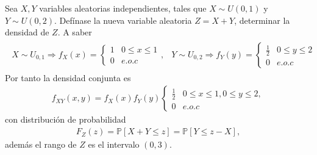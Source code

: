\begin{Ejem}
\item Sea $X,Y$ variables aleatorias independientes, tales que $X\sim U\left(0,1\right)$ y $Y\sim U\left(0,2\right)$. Def\'inase la nueva variable aleatoria $Z=X+Y$, determinar la densidad de $Z$.
A saber
\begin{eqnarray*}
\begin{array}{ll}
X\sim U_{0,1} \Rightarrow f_{X}\left( x \right)= 
\begin{cases}
1 & 0\leq x \leq 1\\
0 & e.o.c
\end{cases},
&
Y\sim U_{0,2} \Rightarrow f_{Y}\left( y \right)= 
\begin{cases}
\frac{1}{2} & 0\leq y \leq 2\\
0 & e.o.c
\end{cases}
\end{array}
\end{eqnarray*}
Por tanto la densidad conjunta es
\begin{eqnarray*}
f_{XY}\left( x,y \right)= f_{X}\left(x\right)f_{Y}\left(y\right)
\begin{cases}
\frac{1}{2} & 0\leq x \leq 1, 0\leq y \leq 2,\\
0 & e.o.c
\end{cases}
\end{eqnarray*}
con distribuci\'on de probabilidad
\begin{eqnarray*}
F_{Z}\left(z\right)= \mathbb{P}\left[X+Y\leq z \right]= \mathbb{P}\left[Y \leq z-X \right],
\end{eqnarray*}
adem\'as el rango de $Z$ es el intervalo $\left(0,3\right)$.
\end{Ejem}

